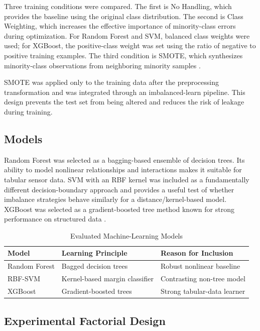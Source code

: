 \documentclass[conference]{IEEEtran}
\begin{document}
Three training conditions were compared. The first is No Handling, which provides the baseline using the original class distribution. The second is Class Weighting, which increases the effective importance of minority-class errors during optimization. For Random Forest and SVM, balanced class weights were used; for XGBoost, the positive-class weight was set using the ratio of negative to positive training examples. The third condition is SMOTE, which synthesizes minority-class observations from neighboring minority samples \cite{chawla2002smote}.

SMOTE was applied only to the training data after the preprocessing transformation and was integrated through an imbalanced-learn pipeline. This design prevents the test set from being altered and reduces the risk of leakage during training.

\subsection{Models}

Random Forest was selected as a bagging-based ensemble of decision trees. Its ability to model nonlinear relationships and interactions makes it suitable for tabular sensor data. SVM with an RBF kernel was included as a fundamentally different decision-boundary approach and provides a useful test of whether imbalance strategies behave similarly for a distance/kernel-based model. XGBoost was selected as a gradient-boosted tree method known for strong performance on structured data \cite{chen2016xgboost}.

\begin{table}[h]
\centering
\caption{Evaluated Machine-Learning Models}
\label{tab:models}
\small
\begin{tabularx}{\columnwidth}{|l|l|X|}
\hline
\textbf{Model} & \textbf{Learning Principle} & \textbf{Reason for Inclusion} \\
\hline
Random Forest & Bagged decision trees & Robust nonlinear baseline \\
RBF-SVM & Kernel-based margin classifier & Contrasting non-tree model \\
XGBoost & Gradient-boosted trees & Strong tabular-data learner \\
\hline
\end{tabularx}
\end{table}

\subsection{Experimental Factorial Design}
\end{document}
